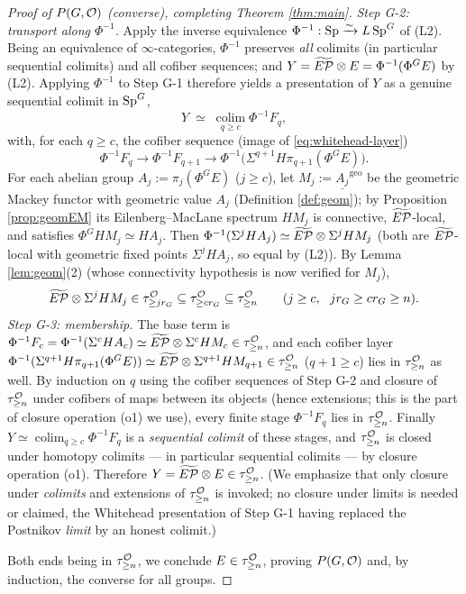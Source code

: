 \begin{proof}[Proof of $P(G,\mathcal{O})$ (converse), completing Theorem \ref{thm:main}]
\emph{Step G-2: transport along $\Phi^{-1}$.} Apply the inverse
equivalence $\Phi^{-1}:\mathrm{Sp}\xrightarrow{\sim}L\,\mathrm{Sp}^G$ of (L2). Being an
equivalence of $\infty$-categories, $\Phi^{-1}$ preserves \emph{all} colimits (in
particular sequential colimits) and all cofiber sequences; and
$Y=\widetilde{E\mathcal P}\otimes E=\Phi^{-1}(\Phi^G E)$ by (L2). Applying $\Phi^{-1}$ to Step G-1
therefore yields a presentation of $Y$ as a genuine sequential colimit in
$\mathrm{Sp}^G$,
\[
Y\;\simeq\;\operatorname*{colim}_{q\ge c}\Phi^{-1}F_q,
\]
with, for each $q\ge c$, the cofiber sequence (image of \eqref{eq:whitehead-layer})
\[
\Phi^{-1}F_q\longrightarrow\Phi^{-1}F_{q+1}\longrightarrow
\Phi^{-1}\bigl(\Sigma^{q+1}H\pi_{q+1}(\Phi^G E)\bigr).
\]
For each abelian group $A_j:=\pi_j(\Phi^G E)$ ($j\ge c$), let
$M_j:=\underline{A_j}^{\mathrm{geo}}$ be the geometric Mackey functor with
geometric value $A_j$ (Definition \ref{def:geom}); by Proposition
\ref{prop:geomEM} its Eilenberg--MacLane spectrum $HM_j$ is connective,
$\widetilde{E\mathcal P}$-local, and satisfies $\Phi^G HM_j\simeq HA_j$. Then
$\Phi^{-1}(\Sigma^j HA_j)\simeq\widetilde{E\mathcal P}\otimes\Sigma^j HM_j$ (both are $\widetilde{E\mathcal P}$-local with
geometric fixed points $\Sigma^j HA_j$, so equal by (L2)). By Lemma
\ref{lem:geom}(2) (whose connectivity hypothesis is now verified for $M_j$),
\[
\widetilde{E\mathcal P}\otimes\Sigma^j HM_j\in\tau^{\mathcal{O}}_{\ge j r_G}\subseteq\tau^{\mathcal{O}}_{\ge c r_G}
\subseteq\tau^{\mathcal{O}}_{\ge n}\qquad(j\ge c,\ \ j r_G\ge c r_G\ge n).
\]
\emph{Step G-3: membership.} The base term is
$\Phi^{-1}F_c=\Phi^{-1}(\Sigma^c HA_c)\simeq\widetilde{E\mathcal P}\otimes\Sigma^c HM_c
\in\tau^{\mathcal{O}}_{\ge n}$, and each cofiber layer
$\Phi^{-1}(\Sigma^{q+1}H\pi_{q+1}(\Phi^G E))\simeq\widetilde{E\mathcal P}\otimes\Sigma^{q+1}HM_{q+1}
\in\tau^{\mathcal{O}}_{\ge n}$ ($q+1\ge c$) lies in $\tau^{\mathcal{O}}_{\ge n}$ as well. By induction
on $q$ using the cofiber sequences of Step G-2 and closure of $\tau^{\mathcal{O}}_{\ge n}$
under cofibers of maps between its objects (hence extensions; this is the part of
closure operation (o1) we use), every finite stage $\Phi^{-1}F_q$ lies in
$\tau^{\mathcal{O}}_{\ge n}$. Finally $Y\simeq\operatorname*{colim}_{q\ge c}\Phi^{-1}F_q$ is a
\emph{sequential colimit} of these stages, and $\tau^{\mathcal{O}}_{\ge n}$ is closed under
homotopy colimits --- in particular sequential colimits --- by closure operation
(o1). Therefore $Y=\widetilde{E\mathcal P}\otimes E\in\tau^{\mathcal{O}}_{\ge n}$. (We emphasize that only
closure under \emph{colimits} and extensions of $\tau^{\mathcal{O}}_{\ge n}$ is invoked; no
closure under limits is needed or claimed, the Whitehead presentation of Step G-1
having replaced the Postnikov \emph{limit} by an honest colimit.)

Both ends being in $\tau^{\mathcal{O}}_{\ge n}$, we conclude $E\in\tau^{\mathcal{O}}_{\ge n}$, proving
$P(G,\mathcal{O})$ and, by induction, the converse for all groups.
\end{proof}

